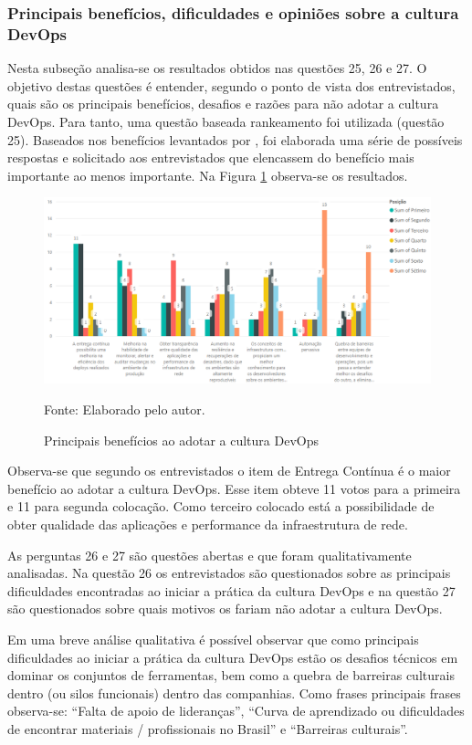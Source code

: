 \documentclass[twoside,english,brazilian]{UNISINOSartigo}
\newcommand{\source}[1]{\caption*{Fonte: {#1}} }
\begin{document}
\subsubsection{Principais benefícios, dificuldades e opiniões sobre a cultura DevOps}
Nesta subseção analisa-se os resultados obtidos nas questões 25, 26 e 27. O objetivo destas questões é entender, segundo o ponto de vista dos entrevistados, quais são os principais benefícios, desafios e razões para não adotar a cultura DevOps. Para tanto,  uma questão baseada rankeamento foi utilizada  (questão 25). Baseados nos benefícios levantados por , foi elaborada uma série de possíveis respostas e solicitado aos entrevistados que elencassem do benefício mais importante ao menos importante. Na Figura \ref{fig:AnaliseRanking} observa-se os resultados.
\begin{figure}[!ht]
    \centering
    \caption{Principais benefícios ao adotar a cultura DevOps}
       \includegraphics[scale=.6]{imagens/questao25.png}
        \source{Elaborado pelo autor.}
        \label{fig:AnaliseRanking}
\end{figure}
 Observa-se que segundo os entrevistados o item de Entrega Contínua é o maior benefício ao adotar a cultura DevOps. Esse item obteve 11 votos para a primeira e 11 para segunda colocação. Como terceiro colocado está a possibilidade de obter qualidade das aplicações e performance da infraestrutura de rede.
 
As perguntas 26 e 27 são questões abertas e que foram qualitativamente analisadas. Na questão 26 os entrevistados são questionados sobre as principais dificuldades encontradas ao iniciar a prática da cultura DevOps e na questão 27 são questionados sobre quais motivos os fariam não adotar a cultura DevOps.

Em uma breve análise qualitativa é possível observar que como principais dificuldades ao iniciar a prática da cultura DevOps estão os desafios técnicos em dominar os conjuntos de ferramentas, bem como a quebra de barreiras culturais dentro (ou silos funcionais) dentro das companhias. Como frases principais frases observa-se: ``Falta de apoio de lideranças'', ``Curva de aprendizado ou dificuldades de encontrar materiais / profissionais no Brasil'' e ``Barreiras culturais''. 
\end{document}
